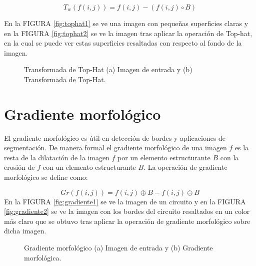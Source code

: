 \begin{equation}
\label{eq:tophatTrans}
T_w(f(i,j))=f(i,j) - (f(i,j) \circ B)
\end{equation}

  En la FIGURA \ref{fig:tophat1} se ve una imagen con pequeñas superficies claras y en la FIGURA \ref{fig:tophat2} se ve la imagen tras aplicar la operación de Top-hat, en la cual se puede ver estas superficies resaltadas con respecto al fondo de la imagen. 

\begin{figure}[H]
	\centering
	\caption{Transformada de Top-Hat (a) Imagen de entrada y (b) Transformada de Top-Hat.}
	\label{fig:tophat}
\end{figure}

\section{Gradiente morfológico} 
El gradiente morfológico es útil en detección de bordes y aplicaciones de segmentación. De manera formal el gradiente morfológico de una imagen $f$ es la resta de la dilatación de la imagen $f$ por un elemento estructurante $B$ con la erosión de $f$ con un elemento estructurante $B$. La operación de gradiente morfológico se define como:
 

\begin{equation}
\label{eq:gradienteMor}
Gr(f(i,j))=f(i,j)\oplus B-f(i,j)\ominus B
\end{equation}
%
En la FIGURA \ref{fig:gradiente1} se ve la imagen de un circuito y en la FIGURA \ref{fig:gradiente2} se ve la imagen con los bordes del circuito resaltados en un color más claro que se obtuvo tras aplicar la operación de gradiente morfológico sobre dicha imagen.

\begin{figure}[H]
	\centering
	\caption{Gradiente morfológico (a) Imagen de entrada y (b) Gradiente morfológica.}
	\label{fig:gradiente}
\end{figure}



